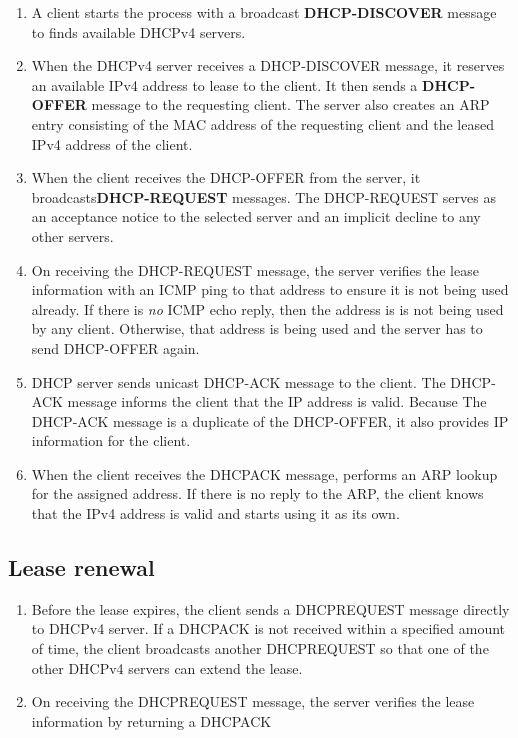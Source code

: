 \begin{enumerate}
\item A client starts the process with a broadcast \textbf{DHCP-DISCOVER} message to finds available DHCPv4 servers.

\item When the DHCPv4 server receives a DHCP-DISCOVER message, it reserves an available IPv4 address to lease to the client. It then sends a \textbf{DHCP-OFFER} message to the requesting client. The server also creates an ARP entry consisting of the MAC address of the requesting client and the leased IPv4 address of the client.

\item When the client receives the DHCP-OFFER from the server, it broadcasts\textbf{DHCP-REQUEST} messages. The DHCP-REQUEST serves as an acceptance notice to the selected server and an implicit decline to any other servers.

\item On receiving the DHCP-REQUEST message, the server verifies the lease information with an ICMP ping to that address to ensure it is not being used already. If there is \emph{no} ICMP echo reply, then the address is is not being used by any client. Otherwise, that address is being used and the server has to send DHCP-OFFER again.

\item DHCP server sends  unicast DHCP-ACK message to the client. The DHCP-ACK message informs the client that the IP address is valid. Because The DHCP-ACK message is a duplicate of the DHCP-OFFER, it also provides IP information for the client.

\item When the client receives the DHCPACK message, performs an ARP lookup for the assigned address.
If there is no reply to the ARP, the client knows that the IPv4 address is valid and starts using it as its own.
\end{enumerate}



\subsection{Lease renewal}

\begin{enumerate}
\item Before the lease expires, the client sends a DHCPREQUEST message directly to DHCPv4 server. If a DHCPACK is not received within a specified amount of time, the client broadcasts another DHCPREQUEST so that one of the other DHCPv4 servers can extend the lease.

\item On receiving the DHCPREQUEST message, the server verifies the lease information by returning a DHCPACK
\end{enumerate}

